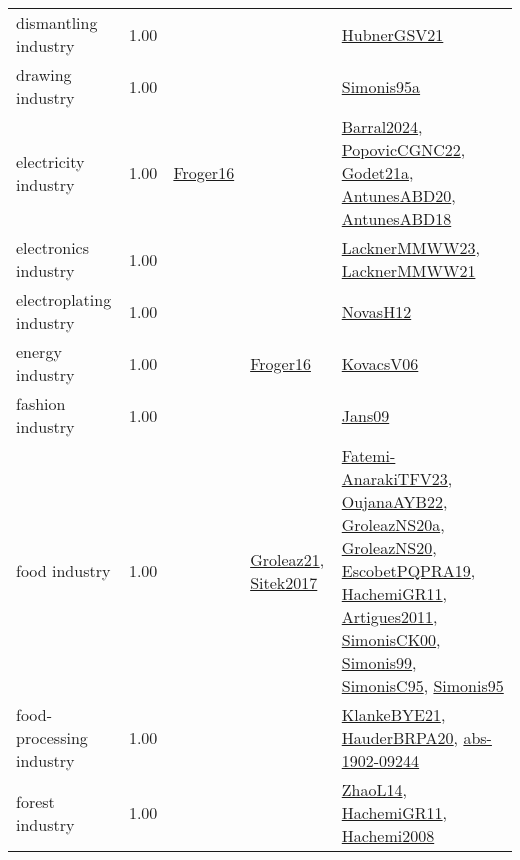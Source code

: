 {\begin{longtable}{p{3cm}r>{\raggedright\arraybackslash}p{6cm}>{\raggedright\arraybackslash}p{6cm}>{\raggedright\arraybackslash}p{8cm}}
\index{dismantling industry}\index{Industries!dismantling industry}dismantling industry &  1.00 &  &  & \hyperref[detail:HubnerGSV21]{HubnerGSV21}\\
\index{drawing industry}\index{Industries!drawing industry}drawing industry &  1.00 &  &  & \hyperref[detail:Simonis95a]{Simonis95a}\\
\index{electricity industry}\index{Industries!electricity industry}electricity industry &  1.00 & \hyperref[detail:Froger16]{Froger16} &  & \hyperref[detail:Barral2024]{Barral2024}, \hyperref[detail:PopovicCGNC22]{PopovicCGNC22}, \hyperref[detail:Godet21a]{Godet21a}, \hyperref[detail:AntunesABD20]{AntunesABD20}, \hyperref[detail:AntunesABD18]{AntunesABD18}\\
\index{electronics industry}\index{Industries!electronics industry}electronics industry &  1.00 &  &  & \hyperref[detail:LacknerMMWW23]{LacknerMMWW23}, \hyperref[detail:LacknerMMWW21]{LacknerMMWW21}\\
\index{electroplating industry}\index{Industries!electroplating industry}electroplating industry &  1.00 &  &  & \hyperref[detail:NovasH12]{NovasH12}\\
\index{energy industry}\index{Industries!energy industry}energy industry &  1.00 &  & \hyperref[detail:Froger16]{Froger16} & \hyperref[detail:KovacsV06]{KovacsV06}\\
\index{fashion industry}\index{Industries!fashion industry}fashion industry &  1.00 &  &  & \hyperref[detail:Jans09]{Jans09}\\
\index{food industry}\index{Industries!food industry}food industry &  1.00 &  & \hyperref[detail:Groleaz21]{Groleaz21}, \hyperref[detail:Sitek2017]{Sitek2017} & \hyperref[detail:Fatemi-AnarakiTFV23]{Fatemi-AnarakiTFV23}, \hyperref[detail:OujanaAYB22]{OujanaAYB22}, \hyperref[detail:GroleazNS20a]{GroleazNS20a}, \hyperref[detail:GroleazNS20]{GroleazNS20}, \hyperref[detail:EscobetPQPRA19]{EscobetPQPRA19}, \hyperref[detail:HachemiGR11]{HachemiGR11}, \hyperref[detail:Artigues2011]{Artigues2011}, \hyperref[detail:SimonisCK00]{SimonisCK00}, \hyperref[detail:Simonis99]{Simonis99}, \hyperref[detail:SimonisC95]{SimonisC95}, \hyperref[detail:Simonis95]{Simonis95}\\
\index{food-processing industry}\index{Industries!food-processing industry}food-processing industry &  1.00 &  &  & \hyperref[detail:KlankeBYE21]{KlankeBYE21}, \hyperref[detail:HauderBRPA20]{HauderBRPA20}, \hyperref[detail:abs-1902-09244]{abs-1902-09244}\\
\index{forest industry}\index{Industries!forest industry}forest industry &  1.00 &  &  & \hyperref[detail:ZhaoL14]{ZhaoL14}, \hyperref[detail:HachemiGR11]{HachemiGR11}, \hyperref[detail:Hachemi2008]{Hachemi2008}\\

\end{longtable}}
